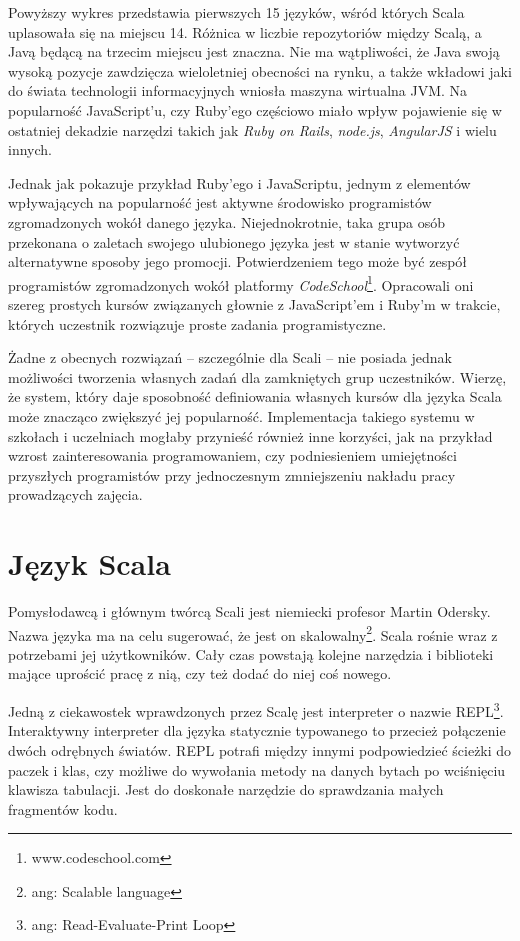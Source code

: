\documentclass[brudnopis]{xmgr}
\begin{document}
Powyższy wykres przedstawia pierwszych 15 języków, wśród których Scala uplasowała się na miejscu 14. Różnica w liczbie repozytoriów między Scalą, a Javą będącą na trzecim miejscu jest znaczna. Nie ma wątpliwości, że Java swoją wysoką pozycje zawdzięcza wieloletniej obecności na rynku, a także wkładowi jaki do świata technologii informacyjnych wniosła maszyna wirtualna JVM. Na popularność JavaScript'u, czy Ruby'ego częściowo miało wpływ pojawienie się w ostatniej dekadzie narzędzi takich jak \textit{Ruby on Rails}, \textit{node.js}, \textit{AngularJS} i wielu innych. 

Jednak jak pokazuje przykład Ruby'ego i JavaScriptu, jednym z elementów wpływających na popularność jest aktywne środowisko programistów zgromadzonych wokół danego języka. Niejednokrotnie, taka grupa osób przekonana o zaletach swojego ulubionego języka jest w stanie wytworzyć alternatywne sposoby jego promocji. Potwierdzeniem tego może być zespół programistów zgromadzonych wokół platformy \textit{CodeSchool}\footnote{www.codeschool.com}. Opracowali oni szereg prostych kursów związanych głownie z JavaScript'em i Ruby'm w trakcie, których uczestnik rozwiązuje proste zadania programistyczne. 

Żadne z obecnych rozwiązań -- szczególnie dla Scali -- nie posiada jednak możliwości tworzenia własnych zadań dla zamkniętych grup uczestników. Wierzę, że system, który daje sposobność definiowania własnych kursów dla języka Scala może znacząco zwiększyć jej popularność. Implementacja takiego systemu w szkołach i uczelniach mogłaby przynieść również inne korzyści, jak na przykład wzrost zainteresowania programowaniem, czy podniesieniem umiejętności przyszłych programistów przy jednoczesnym zmniejszeniu nakładu pracy prowadzących zajęcia.

\section{Język Scala}

Pomysłodawcą i głównym twórcą Scali jest niemiecki profesor Martin Odersky. Nazwa języka ma na celu sugerować, że jest on skalowalny\footnote{ang: Scalable language}. Scala rośnie wraz z potrzebami jej użytkowników. Cały czas powstają kolejne narzędzia i biblioteki mające uprościć pracę z nią, czy też dodać do niej coś nowego. 

Jedną z ciekawostek wprawdzonych przez Scalę jest interpreter o nazwie REPL\footnote{ang: Read-Evaluate-Print Loop}. Interaktywny interpreter dla języka statycznie typowanego to przecież połączenie dwóch odrębnych światów. REPL potrafi między innymi podpowiedzieć ścieżki do paczek i klas, czy możliwe do wywołania metody na danych bytach po wciśnięciu klawisza tabulacji. Jest do doskonałe narzędzie do sprawdzania małych fragmentów kodu.
\end{document}
